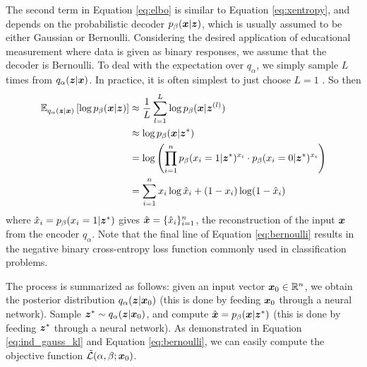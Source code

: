 The second term in Equation \ref{eq:elbo} is similar to Equation \ref{eq:xentropy}, and depends on the probabilistic decoder $p_\beta(\boldsymbol{x} | \boldsymbol{z})$, which is usually assumed to be either Gaussian or Bernoulli. Considering the desired application of educational measurement where data is given as binary responses, we assume that the decoder is Bernoulli. To deal with the expectation over $q_\alpha$, we simply sample $L$ times from $q_\alpha(\boldsymbol{z} | \boldsymbol{x})$. In practice, it is often simplest to just choose $L=1$ \cite{kingma2014}. So then 
\begin{equation}
  \begin{split}
    \mathbb{E}_{q_\alpha(\boldsymbol{z} | \boldsymbol{x})} \left[ \log p_\beta(\boldsymbol{x} | \boldsymbol{z}) \right] &\approx \frac{1}{L}\sum_{l=1}^L \log p_\beta(\boldsymbol{x} | \boldsymbol{z}^{(l)}) \\
    &\approx \log p_\beta(\boldsymbol{x}| \boldsymbol{z}^*) \\
    &= \log\left( \prod_{i=1}^n p_\beta(x_i = 1 | \boldsymbol{z}^*)^{x_i} \cdot p_\beta(x_i=0 | \boldsymbol{z}^*)^{x_i} \right) \\
  &= \sum_{i=1}^n x_i\log \hat x_i + (1-x_i)\log (1-\hat x_i)
  \end{split}
  \label{eq:bernoulli}
\end{equation}
where $\hat x_i = p_\beta(x_i=1 | \boldsymbol{z}^*)$ gives $\hat{\boldsymbol{x}} = \{\hat x_i\}_{i=1}^n$, the reconstruction of the input $\boldsymbol{x}$ from the encoder $q_\alpha$. Note that the final line of Equation \ref{eq:bernoulli} results in the negative binary cross-entropy loss function commonly used in classification problems.

The process is summarized as follows: given an input vector $\boldsymbol{x}_0 \in \mathbb{R}^n$, we obtain the posterior distribution $q_\alpha(\boldsymbol{z} | \boldsymbol{x}_0)$ (this is done by feeding $\boldsymbol{x}_0$ through a neural network). Sample $\boldsymbol{z}^* \sim q_\alpha(\boldsymbol{z} |\boldsymbol{x}_0)$, and compute $\hat{\boldsymbol{x}} = p_\beta(\boldsymbol{x} | \boldsymbol{z}^*)$ (this is done by feeding $\boldsymbol{z}^*$ through a neural network). As demonstrated in Equation \ref{eq:ind_gauss_kl} and Equation \ref{eq:bernoulli}, we can easily compute the objective function $\tilde{\mathcal{L}}(\alpha, \beta; \boldsymbol{x}_0)$.

